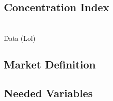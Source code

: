 \documentclass{article}
\begin{document}
\subsection{Concentration Index}

\section{}{Data (Lol)}

\subsection{Market Definition}

\subsection{Needed Variables}
\end{document}
